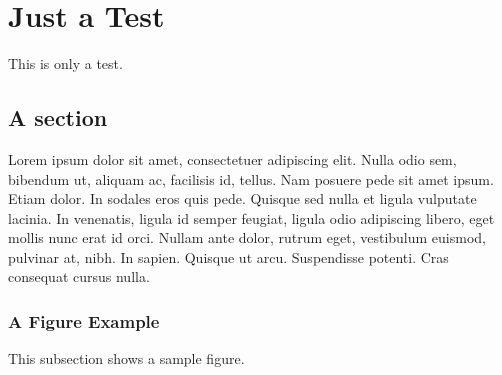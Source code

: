 \documentclass[12pt,chapterheads]{ucsd}
\begin{document}
%







%   
%   
%










\chapter{Just a Test}
This is only a test.
\section{A section}
Lorem ipsum dolor sit amet, consectetuer adipiscing elit. Nulla odio
sem, bibendum ut, aliquam ac, facilisis id, tellus. Nam posuere pede
sit amet ipsum. Etiam dolor. In sodales eros quis pede.  Quisque sed
nulla et ligula vulputate lacinia. In venenatis, ligula id semper
feugiat, ligula odio adipiscing libero, eget mollis nunc erat id orci.
Nullam ante dolor, rutrum eget, vestibulum euismod, pulvinar at, nibh.
In sapien. Quisque ut arcu. Suspendisse potenti. Cras consequat cursus
nulla.

\subsection{A Figure Example}
\label{ssec:figure_example}

This subsection shows a sample figure.
\end{document}
